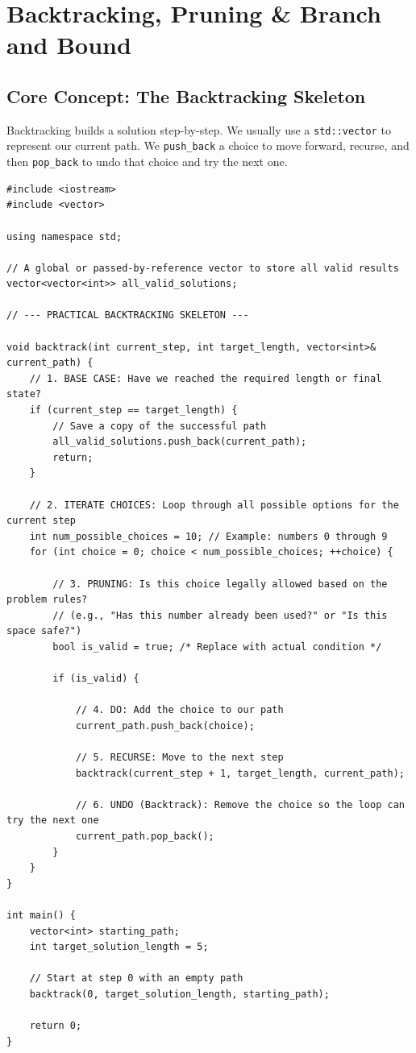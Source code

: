 \section{Backtracking, Pruning \& Branch and Bound}

\subsection{Core Concept: The Backtracking Skeleton}
Backtracking builds a solution step-by-step. We usually use a \texttt{std::vector} to represent our current path. We \texttt{push\_back} a choice to move forward, recurse, and then \texttt{pop\_back} to undo that choice and try the next one.

\begin{lstlisting}
#include <iostream>
#include <vector>

using namespace std;

// A global or passed-by-reference vector to store all valid results
vector<vector<int>> all_valid_solutions;

// --- PRACTICAL BACKTRACKING SKELETON ---

void backtrack(int current_step, int target_length, vector<int>& current_path) {
    // 1. BASE CASE: Have we reached the required length or final state?
    if (current_step == target_length) {
        // Save a copy of the successful path
        all_valid_solutions.push_back(current_path);
        return;
    }
    
    // 2. ITERATE CHOICES: Loop through all possible options for the current step
    int num_possible_choices = 10; // Example: numbers 0 through 9
    for (int choice = 0; choice < num_possible_choices; ++choice) {
        
        // 3. PRUNING: Is this choice legally allowed based on the problem rules?
        // (e.g., "Has this number already been used?" or "Is this space safe?")
        bool is_valid = true; /* Replace with actual condition */
        
        if (is_valid) {
            
            // 4. DO: Add the choice to our path
            current_path.push_back(choice);
            
            // 5. RECURSE: Move to the next step
            backtrack(current_step + 1, target_length, current_path);
            
            // 6. UNDO (Backtrack): Remove the choice so the loop can try the next one
            current_path.pop_back();
        }
    }
}

int main() {
    vector<int> starting_path;
    int target_solution_length = 5;
    
    // Start at step 0 with an empty path
    backtrack(0, target_solution_length, starting_path);
    
    return 0;
}
\end{lstlisting}


